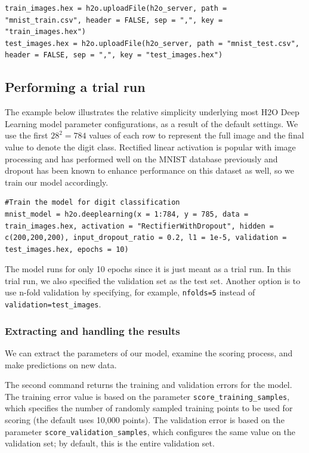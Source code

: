 \documentclass{article}[11pt]
\begin{document}
\begin{lstlisting}[breaklines,basicstyle=\ttfamily]
train_images.hex = h2o.uploadFile(h2o_server, path = "mnist_train.csv", header = FALSE, sep = ",", key = "train_images.hex")
test_images.hex = h2o.uploadFile(h2o_server, path = "mnist_test.csv", header = FALSE, sep = ",", key = "test_images.hex")
\end{lstlisting}

\subsection{Performing a trial run}
\label{ssec:TrialRun} 
The example below illustrates the relative simplicity underlying most H2O Deep Learning model parameter configurations, as a result of the default settings. We use the first $28^2 = 784$ values of each row to represent the full image and the final value to denote the digit class. Rectified linear activation is popular with image processing and has performed well on the MNIST database previously and dropout has been known to enhance performance on this dataset as well, so we train our model accordingly. 

\begin{lstlisting}[breaklines,basicstyle=\ttfamily]
#Train the model for digit classification
mnist_model = h2o.deeplearning(x = 1:784, y = 785, data = train_images.hex, activation = "RectifierWithDropout", hidden = c(200,200,200), input_dropout_ratio = 0.2, l1 = 1e-5, validation = test_images.hex, epochs = 10)

\end{lstlisting}
\normalsize

\noindent
The model runs for only 10 epochs since it is just meant  as a trial run. In this trial run, we also specified the validation set as the test set. Another option is to use n-fold validation by specifying, for example, \texttt{nfolds=5} instead of \texttt{validation=test\_images}. 

\subsubsection{Extracting and handling the results} 

We can extract the parameters of our model, examine the scoring process, and make predictions on new data.

\noindent
The second command returns the training and validation errors for the model. The training error value is based on the parameter \texttt{score\_training\_samples}, which specifies the number of randomly sampled training points to be used for scoring  (the default uses 10,000 points). The validation error is based on the parameter \texttt{score\_validation\_samples}, which configures the same value on the validation set; by default, this is the entire validation set.
\end{document}
